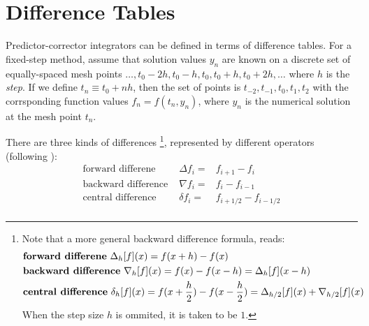 \section{Difference Tables}
Predictor-corrector integrators can be defined in terms of difference tables. 
For a fixed-step method, assume that solution values \( y_n \) are known on a 
discrete set of equally-spaced mesh points 
\( \ldots, t_0 - 2h , t_0 - h , t_0 , t_0 + h , t_0 + 2h , \ldots \)
where \( h \) is the \emph{step}. If we define \(  t_n \equiv t_0 + n h \), then the 
set of points is \( t_{-2}, t_{-1}, t_0 , t_{1}, t_{2} \) with the corrsponding 
function values \( f_n = f(t_n , y_n ) \), where \( y_n \) is the numerical solution 
at the mesh point \( t_n \).

There are three kinds of differences \footnote{Note that a more general backward difference formula, 
reads:
\begin{equation}
  \begin{aligned}
    & \text{\textbf{forward differene} } {\Delta}_h [f](x) = f(x+h) - f(x)\\  
    & \text{\textbf{backward difference} } {\nabla}_h [f](x) = f(x) - f(x-h) = {\Delta}_h [f](x-h)\\
    & \text{\textbf{central difference} } {\delta}_h [f](x) = f(x+\frac{h}{2}) - f(x-\frac{h}{2}) = {\Delta}_{h/2} [f](x) + {\nabla}_{h/2} [f](x)\\
  \end{aligned}
\end{equation}
When the step size \( h \) is ommited, it is taken to be \(1\). }, 
represented by different operators (following \cite{berry2004}):
\begin{equation}
  \begin{aligned}
    \text{forward differene     } &   \Delta f_i    = & f_{i+1} - f_i \\
    \text{backward difference    } & \nabla f_i  = & f_i - f_{i-1} \\
    \text{central difference    } &   \delta f_i   = & f_{i+1/2} - f_{i-1/2} \\
  \end{aligned}
\end{equation}

